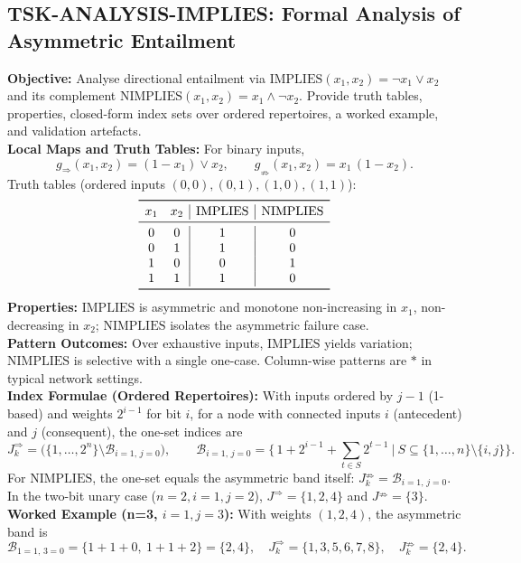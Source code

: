 \documentclass[11pt]{article}
\begin{document}
\subsection{TSK-ANALYSIS-IMPLIES: Formal Analysis of Asymmetric Entailment}
\textbf{Objective:} Analyse directional entailment via \(\mathrm{IMPLIES}(x_1,x_2)=\neg x_1 \lor x_2\) and its complement \(\mathrm{NIMPLIES}(x_1,x_2)=x_1 \land \neg x_2\). Provide truth tables, properties, closed-form index sets over ordered repertoires, a worked example, and validation artefacts.\\
\textbf{Local Maps and Truth Tables:} For binary inputs,
\[
g_{\Rightarrow}(x_1,x_2) = (1-x_1) \lor x_2,\qquad g_{\nRightarrow}(x_1,x_2) = x_1\,(1-x_2).
\]
Truth tables (ordered inputs \((0,0),(0,1),(1,0),(1,1)\)):
\[
\begin{array}{cc|c|c}
\toprule
 x_1 & x_2 & \mathrm{IMPLIES} & \mathrm{NIMPLIES} \\
\midrule
 0 & 0 & 1 & 0 \\
 0 & 1 & 1 & 0 \\
 1 & 0 & 0 & 1 \\
 1 & 1 & 1 & 0 \\
\bottomrule
\end{array}
\]
\textbf{Properties:} \(\mathrm{IMPLIES}\) is asymmetric and monotone non-increasing in \(x_1\), non-decreasing in \(x_2\); \(\mathrm{NIMPLIES}\) isolates the asymmetric failure case.\\
\textbf{Pattern Outcomes:} Over exhaustive inputs, \(\mathrm{IMPLIES}\) yields variation; \(\mathrm{NIMPLIES}\) is selective with a single one-case. Column-wise patterns are \(*\) in typical network settings.\\
\textbf{Index Formulae (Ordered Repertoires):} With inputs ordered by \(j-1\) (1-based) and weights \(2^{i-1}\) for bit \(i\), for a node with connected inputs \(i\) (antecedent) and \(j\) (consequent), the one-set indices are
\[
J^{\Rightarrow}_k = \Big(\{1,\dots,2^n\}\setminus \mathcal{B}_{i=1,\,j=0}\Big),\qquad \mathcal{B}_{i=1,\,j=0}=\Big\{\,1+2^{i-1}+\sum_{t\in S}2^{t-1}\ \Big|\ S\subseteq\{1,\dots,n\}\setminus\{i,j\}\Big\}.
\]
For \(\mathrm{NIMPLIES}\), the one-set equals the asymmetric band itself: \(J^{\nRightarrow}_k=\mathcal{B}_{i=1,\,j=0}\). In the two-bit unary case (\(n=2, i=1, j=2\)), \(J^{\Rightarrow} = \{1,2,4\}\) and \(J^{\nRightarrow} = \{3\}\).\\
\textbf{Worked Example (n=3, \(i=1, j=3\)):} With weights \((1,2,4)\), the asymmetric band is
\[
\mathcal{B}_{1=1,\,3=0} = \{1+1+0,\ 1+1+2\} = \{2,4\},\quad J^{\Rightarrow}_k=\{1,3,5,6,7,8\},\quad J^{\nRightarrow}_k=\{2,4\}.
\]
\end{document}
